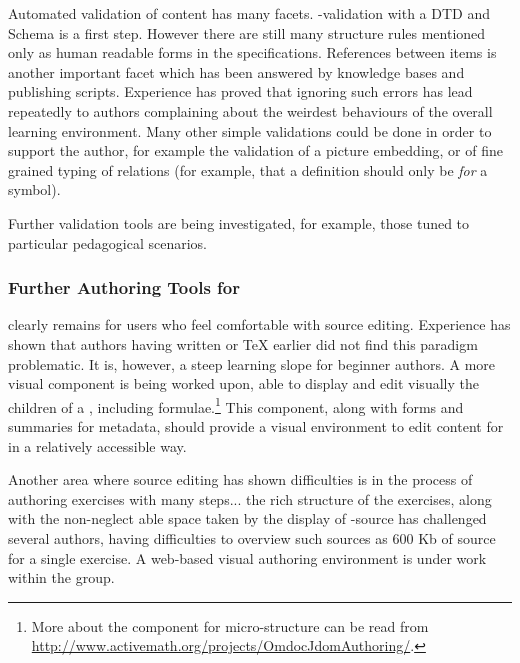 Automated validation of {\omdoc} content has many facets.
{\xml}-validation with a DTD and Schema is a first step.  However there are still many
structure rules mentioned only as human readable forms in the {\omdoc} specifications.
References between {\omdoc} items is another important facet which has been answered by
{\activemath} knowledge bases and publishing scripts.  Experience has proved that ignoring
such errors has lead repeatedly to authors complaining about the weirdest behaviours of
the overall learning environment.  Many other simple validations could be done in order to
support the author, for example the validation of a picture embedding, or of fine grained
typing of relations (for example, that a definition should only be {\emph{for}} a symbol).

Further validation tools are being investigated, for example, those tuned to particular
pedagogical scenarios.


\subsubsection{Further Authoring Tools for {\activemath}} {} clearly
remains for users who feel comfortable with source editing. Experience has shown that
authors having written {\html} or {\TeX} earlier did not find this paradigm problematic.
It is, however, a steep learning slope for beginner authors.  A more visual component is
being worked upon, able to display and edit visually the children of a ,
including formulae.\footnote{More about the component for {\omdoc} micro-structure can be
  read from \url{http://www.activemath.org/projects/OmdocJdomAuthoring/}.}  This
component, along with forms and summaries for metadata, should provide a visual
environment to edit {\omdoc} content for {\activemath} in a relatively accessible way.

Another area where source editing has shown difficulties is in the process of authoring
exercises with many steps... the rich structure of the exercises, along with the non-neglect able
space taken by the display of {\xml}-source has challenged several authors, having
difficulties to overview such sources as 600 Kb of {} source for a single
exercise. 
A web-based visual authoring environment is under work within the {\activemath} group.


